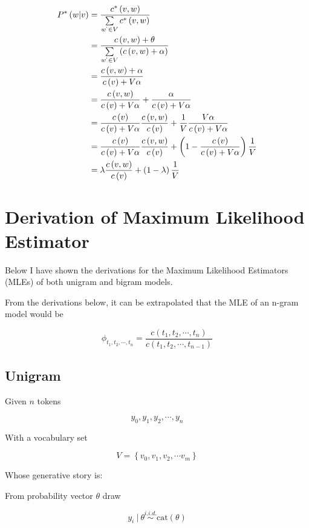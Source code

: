 \documentclass[11pt]{article}
\begin{document}
\begin{align}
P^*\left(w \vert v \right) &= \frac{c^*\left(v, w\right)}{\sum\limits_{w^` \in V} c^*\left(v, w \right)} \\
&= \frac{c \left( v, w \right) + \theta}{\sum\limits_{w^` \in V} \left( c\left( v, w \right) + \alpha \right)} \\
&= \frac{c \left( v, w \right) + \alpha}{c \left( v \right) + V\alpha} \\
&= \frac{c\left(v, w\right)}{c\left( v \right) + V\alpha} + \frac{\alpha}{c\left( v \right) + V\alpha} \\
&= \frac{c\left( v\right)}{c\left( v\right) + V\alpha} \frac{c\left(v, w\right)}{c\left( v \right)} + \frac{1}{V} \frac{V\alpha}{c\left( v \right) + V\alpha} \\
&= \frac{c\left( v\right)}{c\left( v\right) + V\alpha} \frac{c\left(v, w\right)}{c\left( v \right)} + \left( 1 - \frac{c\left( v\right)}{c\left( v\right) + V\alpha} \right) \frac{1}{V} \\
&= \lambda \frac{c\left(v, w\right)}{c\left( v \right)} + \left(1-\lambda\right) \frac{1}{V}
\end{align}

\section{Derivation of Maximum Likelihood Estimator}

Below I have shown the derivations for the Maximum Likelihood Estimators (MLEs) of both unigram and bigram models.

From the derivations below, it can be extrapolated that the MLE of an n-gram model would be

$$\phi_{t_1, t_2, \cdots , t_n} = \frac{c \left( t_1, t_2, \cdots , t_n \right)}{c \left( t_1, t_2, \cdots , t_{n - 1} \right)}$$

\subsection{Unigram}
Given $n$ tokens

$$ y_0, y_1, y_2, \cdots, y_n $$

With a vocabulary set 

$$ V = \left\{ v_0, v_1, v_2, \cdots v_m \right\} $$

Whose generative story is:

From probability vector $\theta$ draw

$$ y_i \: \lvert \: \theta \stackrel{i.i.d.}{\sim} \text{cat} \left( \theta \right) $$
\end{document}
